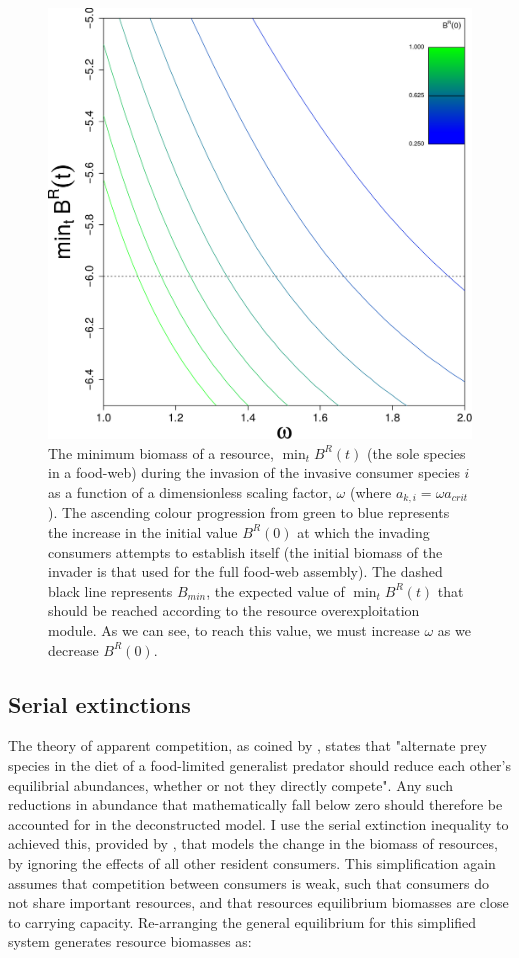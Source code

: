 \documentclass[a4paper]{report}
\DeclareMathOperator{\min}{min}
\begin{document}
\begin{figure}[H]
\centering{}
\includegraphics[scale=0.5]{../Images/Over_exploitative.pdf}
\caption{The minimum biomass of a resource, $\min_{t} B^R(t)$ (the sole species in a food-web) during the invasion of the invasive consumer species $i$ as a function of a dimensionless scaling factor, $\omega$ (where $a_{k,i}=\omega a_{crit}$). The ascending colour progression from green to blue represents the increase in the initial value $B^R(0)$ at which the invading consumers attempts to establish itself (the initial biomass of the invader is that used for the full food-web assembly). The dashed black line represents $B_{min}$, the expected value of $\min_{t} B^R(t)$ that should be reached according to the resource overexploitation module. As we can see, to reach this value, we must increase $\omega$ as we decrease $B^R(0)$.
\label{fig:res_over}}
\end{figure}

\subsection{Serial extinctions}
\label{sec:ser_ext}

The theory of apparent competition, as coined by \citep{Hold1977}, states that "alternate prey species in the diet of a food-limited generalist predator should reduce each other's equilibrial abundances, whether or not they directly compete". Any such reductions in abundance that mathematically fall below zero should therefore be accounted for in the deconstructed model. I use the serial extinction inequality to achieved this, provided by \citep{Rossberg2013}, that models the change in the biomass of resources, by ignoring the effects of all other resident consumers. This simplification again assumes that competition between consumers is weak, such that consumers do not share important resources, and that resources equilibrium biomasses are close to carrying capacity. Re-arranging the general equilibrium for this simplified system generates resource biomasses as:
\end{document}

